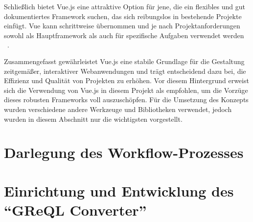 Schließlich bietet Vue.js eine attraktive Option für jene, die ein flexibles und gut dokumentiertes Framework suchen,
das sich reibungslos in bestehende Projekte einfügt. Vue kann schrittweise übernommen und je nach Projektanforderungen
sowohl als Hauptframework als auch für spezifische Aufgaben verwendet werden ~\cite{wohlgethan2018supportingweb}.

Zusammengefasst gewährleistet Vue.js eine stabile Grundlage für die Gestaltung zeitgemäßer, interaktiver Webanwendungen
und trägt entscheidend dazu bei, die Effizienz und Qualität von Projekten zu erhöhen. Vor diesem Hintergrund erweist
sich die Verwendung von Vue.js in diesem Projekt als empfohlen, um die Vorzüge dieses robusten Frameworks voll
auszuschöpfen. Für die Umsetzung des Konzepts wurden verschiedene andere Werkzeuge und Bibliotheken verwendet, jedoch
wurden in diesem Abschnitt nur die wichtigsten vorgestellt.

\section{Darlegung des Workflow-Prozesses}

\section{Einrichtung und Entwicklung des ``GReQL Converter''}